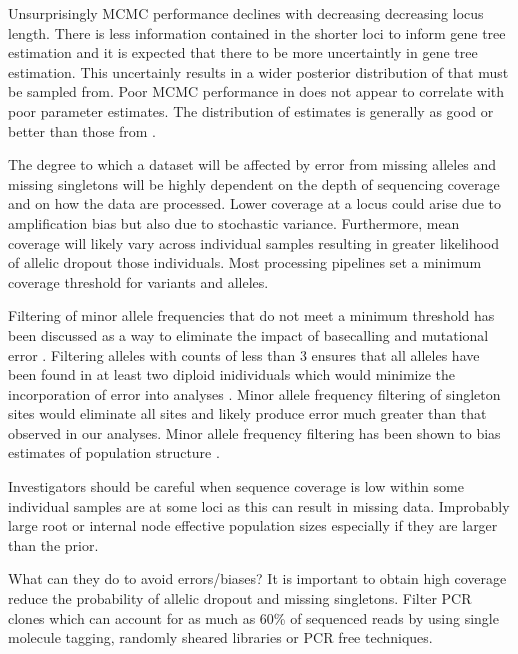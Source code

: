 Unsurprisingly MCMC performance declines with decreasing decreasing locus length.
There is less information contained in the shorter loci to inform gene tree estimation 
and it is expected that there to be more uncertaintly in gene tree estimation.
This uncertainly results in a wider posterior distribution of that must be 
sampled from.
Poor MCMC performance in \beast does not appear to correlate with poor parameter 
estimates. The distribution of estimates is generally as good or better than those 
from \ecoevolity. 


The degree to which a dataset will be affected by error from missing alleles 
and missing singletons will be highly dependent on the depth of sequencing coverage
and on how the data are processed. Lower coverage at a locus could arise due 
to amplification bias but also due to stochastic variance. Furthermore,
mean coverage will likely vary across individual samples resulting in greater 
likelihood of allelic dropout those individuals. Most processing pipelines set 
a minimum coverage threshold for variants and alleles. 

Filtering of minor allele frequencies that do not meet a minimum threshold has 
been discussed as a way to eliminate the impact of basecalling and mutational 
error \citep{linckMinorAlleleFrequency2019}.
Filtering alleles with counts of less than 3 ensures that all alleles have been 
found in at least two diploid inidividuals which would minimize the incorporation 
of error into analyses \citep{rochetteStacksAnalyticalMethods2019}.
Minor allele frequency filtering of singleton sites would eliminate all sites 
and likely produce error much greater than that observed in our analyses.
Minor allele frequency filtering has been shown to bias estimates of population 
structure \citep{linckMinorAlleleFrequency2019}.


Investigators should be careful when sequence coverage is low within some
individual samples are at some loci as this can result in missing data.
Improbably large root or internal node effective population sizes especially if 
they are larger than the prior. 


What can they do to avoid errors/biases?
It is important to obtain high coverage reduce the probability of allelic dropout
and missing singletons. 
Filter PCR clones which can account for as much as 60\% of sequenced reads 
\citep{andrewsHarnessingPowerRADseq2016, smithBiasedEstimatesClonal2014} by using single molecule tagging, randomly sheared libraries or PCR free
techniques.


